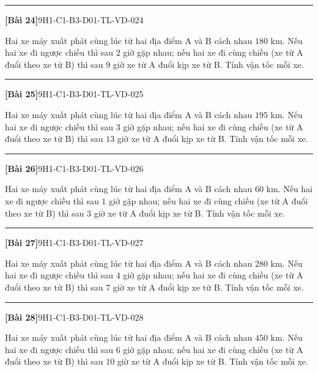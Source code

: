 \documentclass[12pt,a4paper]{article}
\newif\ifloigiai
\newenvironment{cauhoi}[2]{%
  \par\medskip\noindent\rule{\textwidth}{0.4pt}\par\nopagebreak
  \noindent\textbf{[#1]}\hfill{\scriptsize\ttfamily #2}\par\nopagebreak\smallskip}{\par}
\newcommand{\loigiai}[1]{\ifloigiai\par\smallskip\noindent\textit{Lời giải.} #1\par\fi}
\begin{document}
\begin{cauhoi}{Bài 24}{9H1-C1-B3-D01-TL-VD-024}
Hai xe máy xuất phát cùng lúc từ hai địa điểm A và B cách nhau $180$ km. Nếu hai xe đi ngược chiều thì sau $2$ giờ gặp nhau; nếu hai xe đi cùng chiều (xe từ A đuổi theo xe từ B) thì sau $9$ giờ xe từ A đuổi kịp xe từ B. Tính vận tốc mỗi xe.
\loigiai{Gọi vận tốc xe từ A là $x$ (km/h) và xe từ B là $y$ (km/h), $x>y>0$. Đi ngược chiều: $2(x+y)=180$, tức là $x+y=90$. Đi cùng chiều: $9(x-y)=180$, tức là $x-y=20$. Giải hệ ta được $x=55$, $y=35$ (thoả mãn). Vậy vận tốc xe từ A là 55 km/h, xe từ B là 35 km/h.}
\end{cauhoi}
\begin{cauhoi}{Bài 25}{9H1-C1-B3-D01-TL-VD-025}
Hai xe máy xuất phát cùng lúc từ hai địa điểm A và B cách nhau $195$ km. Nếu hai xe đi ngược chiều thì sau $3$ giờ gặp nhau; nếu hai xe đi cùng chiều (xe từ A đuổi theo xe từ B) thì sau $13$ giờ xe từ A đuổi kịp xe từ B. Tính vận tốc mỗi xe.
\loigiai{Gọi vận tốc xe từ A là $x$ (km/h) và xe từ B là $y$ (km/h), $x>y>0$. Đi ngược chiều: $3(x+y)=195$, tức là $x+y=65$. Đi cùng chiều: $13(x-y)=195$, tức là $x-y=15$. Giải hệ ta được $x=40$, $y=25$ (thoả mãn). Vậy vận tốc xe từ A là 40 km/h, xe từ B là 25 km/h.}
\end{cauhoi}
\begin{cauhoi}{Bài 26}{9H1-C1-B3-D01-TL-VD-026}
Hai xe máy xuất phát cùng lúc từ hai địa điểm A và B cách nhau $60$ km. Nếu hai xe đi ngược chiều thì sau $1$ giờ gặp nhau; nếu hai xe đi cùng chiều (xe từ A đuổi theo xe từ B) thì sau $3$ giờ xe từ A đuổi kịp xe từ B. Tính vận tốc mỗi xe.
\loigiai{Gọi vận tốc xe từ A là $x$ (km/h) và xe từ B là $y$ (km/h), $x>y>0$. Đi ngược chiều: $(x+y)=60$, tức là $x+y=60$. Đi cùng chiều: $3(x-y)=60$, tức là $x-y=20$. Giải hệ ta được $x=40$, $y=20$ (thoả mãn). Vậy vận tốc xe từ A là 40 km/h, xe từ B là 20 km/h.}
\end{cauhoi}
\begin{cauhoi}{Bài 27}{9H1-C1-B3-D01-TL-VD-027}
Hai xe máy xuất phát cùng lúc từ hai địa điểm A và B cách nhau $280$ km. Nếu hai xe đi ngược chiều thì sau $4$ giờ gặp nhau; nếu hai xe đi cùng chiều (xe từ A đuổi theo xe từ B) thì sau $7$ giờ xe từ A đuổi kịp xe từ B. Tính vận tốc mỗi xe.
\loigiai{Gọi vận tốc xe từ A là $x$ (km/h) và xe từ B là $y$ (km/h), $x>y>0$. Đi ngược chiều: $4(x+y)=280$, tức là $x+y=70$. Đi cùng chiều: $7(x-y)=280$, tức là $x-y=40$. Giải hệ ta được $x=55$, $y=15$ (thoả mãn). Vậy vận tốc xe từ A là 55 km/h, xe từ B là 15 km/h.}
\end{cauhoi}
\begin{cauhoi}{Bài 28}{9H1-C1-B3-D01-TL-VD-028}
Hai xe máy xuất phát cùng lúc từ hai địa điểm A và B cách nhau $450$ km. Nếu hai xe đi ngược chiều thì sau $6$ giờ gặp nhau; nếu hai xe đi cùng chiều (xe từ A đuổi theo xe từ B) thì sau $10$ giờ xe từ A đuổi kịp xe từ B. Tính vận tốc mỗi xe.
\loigiai{Gọi vận tốc xe từ A là $x$ (km/h) và xe từ B là $y$ (km/h), $x>y>0$. Đi ngược chiều: $6(x+y)=450$, tức là $x+y=75$. Đi cùng chiều: $10(x-y)=450$, tức là $x-y=45$. Giải hệ ta được $x=60$, $y=15$ (thoả mãn). Vậy vận tốc xe từ A là 60 km/h, xe từ B là 15 km/h.}
\end{cauhoi}
\end{document}
